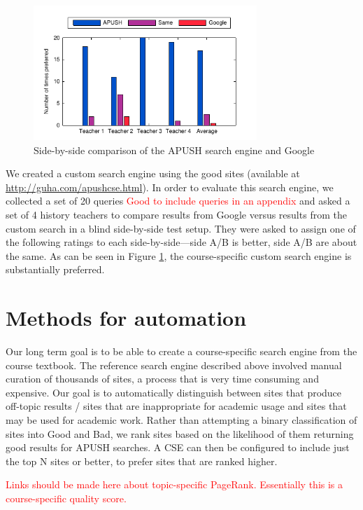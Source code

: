 \documentclass{acm_proc_article-sp}
\begin{document}
\begin{figure}
\includegraphics[width=3.32in]{teacher_eval}
\caption{Side-by-side comparison of the APUSH search engine and Google}
\label{fig-eval}
\end{figure}

We created a custom search engine using the good sites (available at
\url{http://guha.com/apushcse.html}). In order to evaluate this search engine,
we collected a set of 20 queries \textcolor{red}{Good to include queries in an
  appendix} and asked a set of 4 history teachers to
compare results from Google versus results from the custom search in a blind
side-by-side test setup. They were asked to assign one of the following ratings
to each side-by-side---side A/B is better, side A/B are about the same. As can
be seen in Figure \ref{fig-eval}, the course-specific custom search engine is
substantially preferred.

\section{Methods for automation}

Our long term goal is to be able to create a course-specific search engine from
the course textbook. The reference search engine described above involved manual
curation of thousands of sites, a process that is very time consuming and
expensive. Our goal is to automatically distinguish between sites that produce
off-topic results / sites that are inappropriate for academic usage and sites
that may be used for academic work.  Rather than attempting a binary
classification of sites into Good and Bad, we rank sites based on the likelihood
of them returning good results for APUSH searches. A CSE can then be configured
to include just the top N sites or better, to prefer sites that are ranked
higher. 

\textcolor{red}{Links should be made here about topic-specific
  PageRank. Essentially this is a course-specific quality score.}
\end{document}
